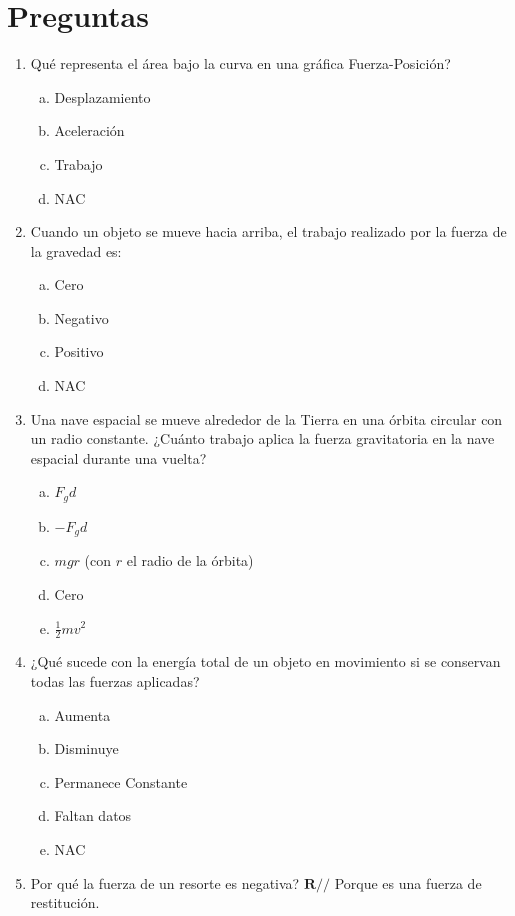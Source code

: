 \section*{Preguntas}
\begin{multicols}{2}
\begin{enumerate}
	
	\item Qué representa el área bajo la curva en una gráfica Fuerza-Posición?
	\begin{enumerate}[a)]
		\item Desplazamiento
		\item Aceleración
		\item \colorbox[rgb]{1,1,0}{Trabajo}
		\item NAC
	\end{enumerate}
	
	
	
	\item Cuando un objeto se mueve hacia arriba, el trabajo realizado por la fuerza de la gravedad es:
	\begin{enumerate}[a)]
		\item Cero
		\item \colorbox[rgb]{1,1,0}{Negativo}
		\item Positivo
		\item NAC
	\end{enumerate}
	
	\columnbreak
	
	\item Una nave espacial se mueve alrededor de la Tierra en una órbita circular con un radio constante. ¿Cuánto trabajo aplica la fuerza gravitatoria en la nave espacial durante una vuelta?
	\begin{enumerate}[a)]
		\item $F_g d$
		\item $-F_g d$
		\item $mgr$ (con $r$ el radio de la órbita)
		\item \colorbox[rgb]{1,1,0}{Cero}
		\item $\frac{1}{2} mv^2$
	\end{enumerate}

	
	
	\item ¿Qué sucede con la energía total de un objeto en movimiento si se conservan todas las fuerzas aplicadas?
	\begin{enumerate}[a)]
		\item Aumenta
		\item Disminuye
		\item \colorbox[rgb]{1,1,0}{Permanece Constante}
		\item Faltan datos
		\item NAC
	\end{enumerate}
	
	
	
	\item Por qué la fuerza de un resorte es negativa? $\mathbf{R//}$ Porque es una fuerza de restitución.
	
	
	
\end{enumerate}
\end{multicols}



